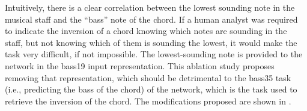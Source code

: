 
Intuitively, there is a clear correlation between the lowest
sounding note in the musical staff and the ``bass'' note of
the chord. If a human analyst was required to indicate the
inversion of a chord knowing which notes are sounding in the
staff, but not knowing which of them is sounding the lowest,
it would make the task very difficult, if not impossible.
The lowest-sounding note is provided to the network in the
\gls{bass19} input representation. This ablation study
proposes removing that representation, which should be
detrimental to the \gls{bass35} task (i.e., predicting the
bass of the chord) of the network, which is the task used to
retrieve the inversion of the chord. The
modifications proposed are shown in .

